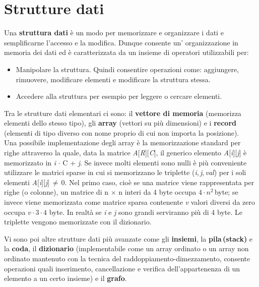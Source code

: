 \documentclass[10pt, a4paper]{report}
\begin{document}
\section{Strutture dati}
Una \textbf{struttura dati} è un modo per memorizzare e organizzare i dati e semplificarne l'accesso e la modifica. Dunque consente un' organizzazione in memoria dei dati ed è caratterizzata da un insieme di operatori utilizzabili per:
\begin{itemize}
\item Manipolare la struttura. Quindi consentire operazioni come: aggiungere, rimuovere, modificare elementi e modificare la struttura stessa.
\item Accedere alla struttura per esempio per leggere o cercare elementi.
\end{itemize}
Tra le strutture dati elementari ci sono: il \textbf{vettore di memoria} (memorizza elementi dello stesso tipo), gli  \textbf{array} (vettori su più dimensioni) e i \textbf{record} (elementi di tipo diverso con nome proprio di cui non importa la posizione).\\Una possibile implementazione degli array è la memorizzazione standard per righe attraverso la quale, data la matrice \textit{A}[\textit{R}][\textit{C}], il generico elemento \textit{A}[\textit{i}][\textit{j}] è memorizzato in \textit{i} $\cdot$ C + \textit{j}. Se invece molti elementi sono nulli è più conveniente utilizzare le matrici sparse in cui si memorizzano le triplette (\textit{i},\,\textit{j},\,\textit{val}) per i soli elementi \textit{A}[\textit{i}][\textit{j}]\,$\neq$\,0. Nel primo caso, cioè se una matrice viene rappresentata per righe (o colonne), un matrice di n $\times$ n interi da 4 byte occupa $4 \cdot n^2$\,byte; se invece viene memorizzata come matrice sparsa contenente \textit{v} valori diversi da zero occupa $v \cdot 3 \cdot 4$ byte. In realtà se \textit{i} e \textit{j} sono grandi serviranno più di 4 byte. Le triplette vengono memorizzate con il dizionario.

Vi sono poi altre strutture dati più avanzate come gli \textbf{insiemi}, la \textbf{pila\,(stack)} e  la \textbf{coda}, il \textbf{dizionario} (implementabile come un array ordinato o un array non ordinato mantenuto con la tecnica del raddoppiamento-dimezzamento, consente operazioni quali inserimento, cancellazione e verifica dell'appartenenza di un elemento a un certo insieme) e il \textbf{grafo}. 
\end{document}
